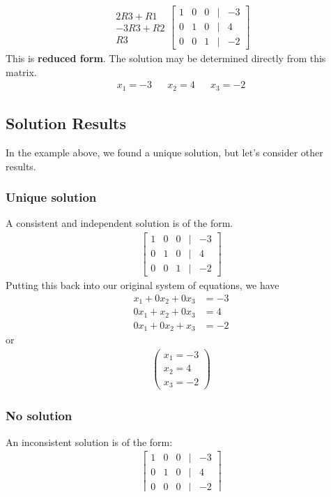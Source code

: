 \documentclass[14pt]{extarticle}
\begin{document}
\begin{align*}
	\begin{array}{r}
		2R3 + R1 \\
		-3R3 + R2 \\
		R3
	\end{array}
	\begin{bmatrix}
		1 & 0 & 0 & | & -3 \\
		0 & 1 & 0 & | & 4 \\
		0 & 0 & 1 & | & -2
	\end{bmatrix}
\end{align*}
This is \textbf{reduced form}. The solution may be determined directly from this matrix.
\begin{align*}
	x_1= -3 & &	x_2 = 4 & &	x_3 = -2
\end{align*}


\subsection*{Solution Results}
In the example above, we found a unique solution, but let's consider other results.
\subsubsection*{Unique solution}
A consistent and independent solution is of the form.
\begin{align*}
	\begin{bmatrix}
		1 & 0 & 0 & | & -3 \\
		0 & 1 & 0 & | & 4 \\
		0 & 0 & 1 & | & -2
	\end{bmatrix}
\end{align*}
Putting this back into our original system of equations, we have
\begin{align*}
	x_1+0x_2 + 0x_3 &= -3 \\
	0x_1+x_2 + 0x_3 &= 4 \\
	0x_1+0x_2 + x_3 &= -2
\end{align*}
or
\begin{align*}
	\begin{pmatrix}
		x_1 = -3	\\
		x_2 = 4	\\
		x_3 = -2	
	\end{pmatrix}
\end{align*}
\subsubsection*{No solution}
An inconsistent solution is of the form:
\begin{align*}
	\begin{bmatrix}
		1 & 0 & 0 & | & -3 \\
		0 & 1 & 0 & | & 4 \\
		0 & 0 & 0 & | & -2
	\end{bmatrix}
\end{align*}
For this we simply state \textit{No Solution}.
\end{document}
